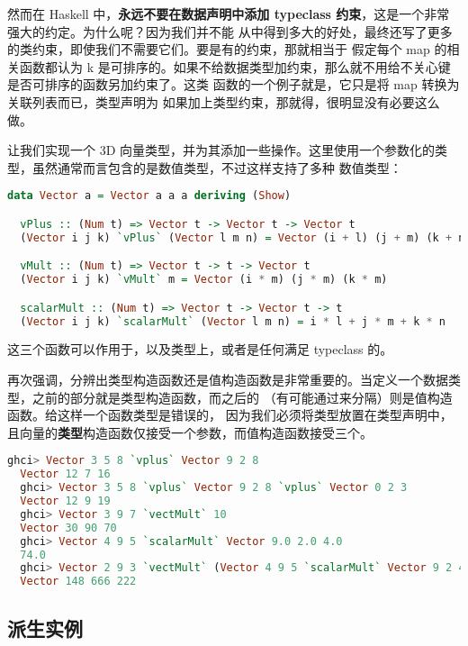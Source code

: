 \documentclass[./main.tex]{subfiles}
\begin{document}
然而在 Haskell 中，\textbf{永远不要在数据声明中添加 typeclass 约束}，这是一个非常强大的约定。为什么呢？因为我们并不能
从中得到多大的好处，最终还写了更多的类约束，即使我们不需要它们。要是有的约束，那就相当于
假定每个 map 的相关函数都认为 k 是可排序的。如果不给数据类型加约束，那么就不用给不关心键是否可排序的函数另加约束了。这类
函数的一个例子就是，它只是将 map 转换为关联列表而已，类型声明为
如果加上类型约束，那就得，很明显没有必要这么做。

让我们实现一个 3D 向量类型，并为其添加一些操作。这里使用一个参数化的类型，虽然通常而言包含的是数值类型，不过这样支持了多种
数值类型：

\begin{lstlisting}[language=Haskell]
  data Vector a = Vector a a a deriving (Show)

  vPlus :: (Num t) => Vector t -> Vector t -> Vector t
  (Vector i j k) `vPlus` (Vector l m n) = Vector (i + l) (j + m) (k + n)

  vMult :: (Num t) => Vector t -> t -> Vector t
  (Vector i j k) `vMult` m = Vector (i * m) (j * m) (k * m)

  scalarMult :: (Num t) => Vector t -> Vector t -> t
  (Vector i j k) `scalarMult` (Vector l m n) = i * l + j * m + k * n
\end{lstlisting}

这三个函数可以作用于，以及类型上，或者是任何满足
 typeclass 的。

再次强调，分辨出类型构造函数还是值构造函数是非常重要的。当定义一个数据类型，\acode{=}之前的部分就是类型构造函数，而之后的
（有可能通过\acode{|}来分隔）则是值构造函数。给这样一个函数类型是错误的，
因为我们必须将类型放置在类型声明中，且向量的\textbf{类型}构造函数仅接受一个参数，而值构造函数接受三个。

\begin{lstlisting}[language=Haskell]
  ghci> Vector 3 5 8 `vplus` Vector 9 2 8
  Vector 12 7 16
  ghci> Vector 3 5 8 `vplus` Vector 9 2 8 `vplus` Vector 0 2 3
  Vector 12 9 19
  ghci> Vector 3 9 7 `vectMult` 10
  Vector 30 90 70
  ghci> Vector 4 9 5 `scalarMult` Vector 9.0 2.0 4.0
  74.0
  ghci> Vector 2 9 3 `vectMult` (Vector 4 9 5 `scalarMult` Vector 9 2 4)
  Vector 148 666 222
\end{lstlisting}

\subsection*{派生实例}
\end{document}
